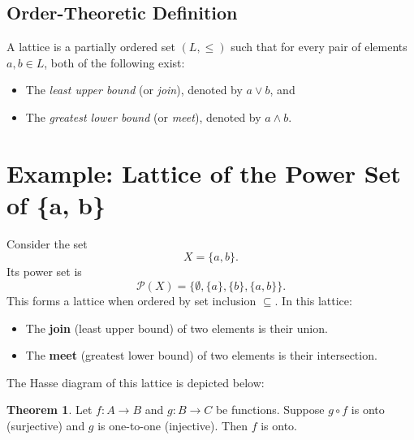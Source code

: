 \documentclass[12pt]{article}
\title{}
\author{Jerich Lee}
\date{\today}
\theoremstyle{definition} %
\newtheorem{theorem}{Theorem}
\theoremstyle{plain} %
\begin{document}
\maketitle
\subsection*{Order-Theoretic Definition}
A lattice is a partially ordered set \((L, \leq)\) such that for every pair of elements \(a, b \in L\), both of the following exist:
\begin{itemize}
    \item The \emph{least upper bound} (or \emph{join}), denoted by \(a \vee b\), and
    \item The \emph{greatest lower bound} (or \emph{meet}), denoted by \(a \wedge b\).
\end{itemize}

\section*{Example: Lattice of the Power Set of \{a, b\}}

Consider the set 
\[
X = \{a, b\}.
\]
Its power set is 
\[
\mathcal{P}(X) = \{ \emptyset, \{a\}, \{b\}, \{a,b\} \}.
\]
This forms a lattice when ordered by set inclusion $\subseteq$. In this lattice:
\begin{itemize}
    \item The \textbf{join} (least upper bound) of two elements is their union.
    \item The \textbf{meet} (greatest lower bound) of two elements is their intersection.
\end{itemize}

The Hasse diagram of this lattice is depicted below:

\begin{center}
\end{center}

\begin{theorem}
    Let $f \colon A \to B$ and $g \colon B \to C$ be functions. Suppose $g \circ f$ is onto (surjective) and $g$ is one-to-one (injective). Then $f$ is onto.
    \end{theorem}
    
\end{document}
